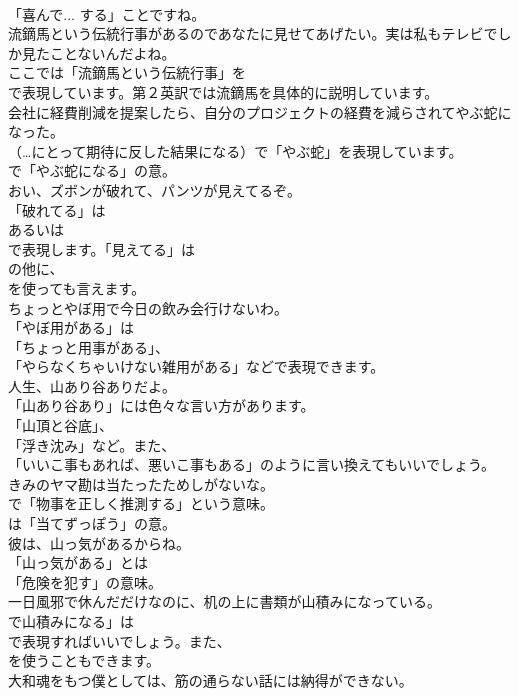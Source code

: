 \documentclass[8pt]{extreport}
\begin{document}
\begin{CJK}{UTF8}{min}
\\	「喜んで... する」ことですね。	
\\	流鏑馬という伝統行事があるのであなたに見せてあげたい。実は私もテレビでしか見たことないんだよね。 
\\	ここでは「流鏑馬という伝統行事」を 
\\	で表現しています。第２英訳では流鏑馬を具体的に説明しています。	
\\	会社に経費削減を提案したら、自分のプロジェクトの経費を減らされてやぶ蛇になった。 
\\	（…にとって期待に反した結果になる）で「やぶ蛇」を表現しています。
\\	で「やぶ蛇になる」の意。	
\\	おい、ズボンが破れて、パンツが見えてるぞ。 
\\	「破れてる」は
\\	あるいは
\\	で表現します。「見えてる」は
\\	の他に、
\\	を使っても言えます。	
\\	ちょっとやぼ用で今日の飲み会行けないわ。 
\\	「やぼ用がある」は
\\	「ちょっと用事がある」、
\\	「やらなくちゃいけない雑用がある」などで表現できます。	
\\	人生、山あり谷ありだよ。 
\\	「山あり谷あり」には色々な言い方があります。
\\	「山頂と谷底」、
\\	「浮き沈み」など。また、
\\	「いいこ事もあれば、悪いこ事もある」のように言い換えてもいいでしょう。	
\\	きみのヤマ勘は当たったためしがないな。 
\\	で「物事を正しく推測する」という意味。
\\	は「当てずっぽう」の意。	
\\	彼は、山っ気があるからね。 
\\	「山っ気がある」とは
\\	「危険を犯す」の意味。	
\\	一日風邪で休んだだけなのに、机の上に書類が山積みになっている。 
\\	で山積みになる」は
\\	で表現すればいいでしょう。また、
\\	を使うこともできます。	
\\	大和魂をもつ僕としては、筋の通らない話には納得ができない。 

\end{CJK}
\end{document}
